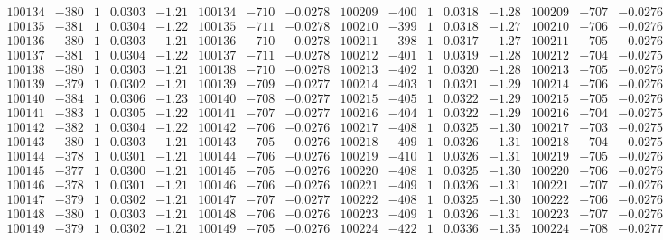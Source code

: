 \documentclass[11pt,reqno,a4letter]{article}
\numberwithin{figure}{section}
\numberwithin{table}{section}
\theoremstyle{plain}
\numberwithin{theorem}{section}
\theoremstyle{definition}
\begin{document}
\begin{table}[ht!]
\begin{equation*}
{\begin{array}{ccccc|ccc||ccccc|ccc}
100134 & -380 & 1 & 0.0303 & -1.21 & 100134 & -710 & -0.0278 & 100209 & -400 & 1 & 0.0318 & -1.28 & 100209 & -707 & -0.0276  \\
100135 & -381 & 1 & 0.0304 & -1.22 & 100135 & -711 & -0.0278 & 100210 & -399 & 1 & 0.0318 & -1.27 & 100210 & -706 & -0.0276  \\
100136 & -380 & 1 & 0.0303 & -1.21 & 100136 & -710 & -0.0278 & 100211 & -398 & 1 & 0.0317 & -1.27 & 100211 & -705 & -0.0276  \\
100137 & -381 & 1 & 0.0304 & -1.22 & 100137 & -711 & -0.0278 & 100212 & -401 & 1 & 0.0319 & -1.28 & 100212 & -704 & -0.0275  \\
100138 & -380 & 1 & 0.0303 & -1.21 & 100138 & -710 & -0.0278 & 100213 & -402 & 1 & 0.0320 & -1.28 & 100213 & -705 & -0.0276  \\
100139 & -379 & 1 & 0.0302 & -1.21 & 100139 & -709 & -0.0277 & 100214 & -403 & 1 & 0.0321 & -1.29 & 100214 & -706 & -0.0276  \\
100140 & -384 & 1 & 0.0306 & -1.23 & 100140 & -708 & -0.0277 & 100215 & -405 & 1 & 0.0322 & -1.29 & 100215 & -705 & -0.0276  \\
100141 & -383 & 1 & 0.0305 & -1.22 & 100141 & -707 & -0.0277 & 100216 & -404 & 1 & 0.0322 & -1.29 & 100216 & -704 & -0.0275  \\
100142 & -382 & 1 & 0.0304 & -1.22 & 100142 & -706 & -0.0276 & 100217 & -408 & 1 & 0.0325 & -1.30 & 100217 & -703 & -0.0275  \\
100143 & -380 & 1 & 0.0303 & -1.21 & 100143 & -705 & -0.0276 & 100218 & -409 & 1 & 0.0326 & -1.31 & 100218 & -704 & -0.0275  \\
100144 & -378 & 1 & 0.0301 & -1.21 & 100144 & -706 & -0.0276 & 100219 & -410 & 1 & 0.0326 & -1.31 & 100219 & -705 & -0.0276  \\
100145 & -377 & 1 & 0.0300 & -1.21 & 100145 & -705 & -0.0276 & 100220 & -408 & 1 & 0.0325 & -1.30 & 100220 & -706 & -0.0276  \\
100146 & -378 & 1 & 0.0301 & -1.21 & 100146 & -706 & -0.0276 & 100221 & -409 & 1 & 0.0326 & -1.31 & 100221 & -707 & -0.0276  \\
100147 & -379 & 1 & 0.0302 & -1.21 & 100147 & -707 & -0.0277 & 100222 & -408 & 1 & 0.0325 & -1.30 & 100222 & -706 & -0.0276  \\
100148 & -380 & 1 & 0.0303 & -1.21 & 100148 & -706 & -0.0276 & 100223 & -409 & 1 & 0.0326 & -1.31 & 100223 & -707 & -0.0276  \\
100149 & -379 & 1 & 0.0302 & -1.21 & 100149 & -705 & -0.0276 & 100224 & -422 & 1 & 0.0336 & -1.35 & 100224 & -708 & -0.0277  \\

\end{array}}
\end{equation*}
\end{table}
\end{document}
